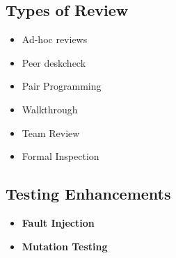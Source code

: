 \documentclass[10pt,portrait]{article}
\begin{document}
\begin{multicols}{ 2 }
\subsection{Types of Review}
\begin{itemize}
    \item Ad-hoc reviews
    \item Peer deskcheck
    \item Pair Programming
    \item Walkthrough
    \item Team Review
    \item Formal Inspection
\end{itemize}

\subsection{Testing Enhancements}
\begin{itemize}
    \item \textbf{Fault Injection}
    \item \textbf{Mutation Testing}
\end{itemize}
\end{multicols}
\end{document}
